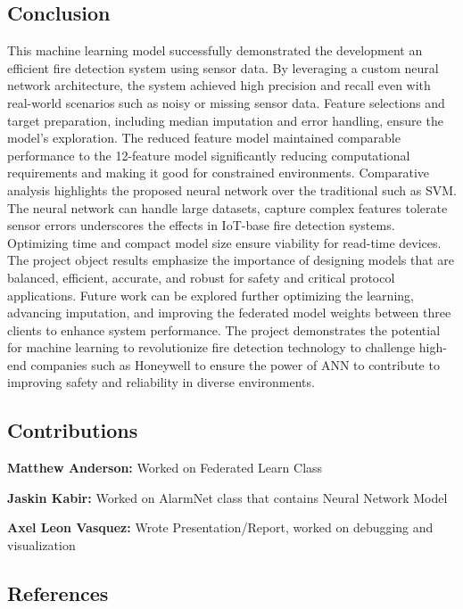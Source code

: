\documentclass[conference]{IEEEtran}
\begin{document}
\subsection{Conclusion}
This machine learning model successfully demonstrated the
development an efficient fire detection system using sensor
data. By leveraging a custom neural network architecture,
the system achieved high precision and recall even with
real-world scenarios such as noisy or missing sensor data.
Feature selections and target preparation, including median
imputation and error handling, ensure the model's
exploration. The reduced feature model maintained comparable
performance to the 12-feature model significantly reducing
computational requirements and making it good for
constrained environments. Comparative analysis highlights
the proposed neural network over the traditional such as
SVM. The neural network can handle large datasets, capture
complex features tolerate sensor errors underscores the
effects in IoT-base fire detection systems. Optimizing time
and compact model size ensure viability for read-time
devices. The project object results emphasize the importance
of designing models that are balanced, efficient, accurate,
and robust for safety and critical protocol applications.
Future work can be explored further optimizing the learning,
advancing imputation, and improving the federated model
weights between three clients to enhance system performance.
The project demonstrates the potential for machine learning
to revolutionize fire detection technology to challenge
high-end companies such as Honeywell to ensure the power of
ANN to contribute to improving safety and reliability in
diverse environments.






\subsection{Contributions}
\textbf{Matthew Anderson:} Worked on Federated Learn Class

\textbf{Jaskin Kabir:} Worked on AlarmNet class that
contains Neural Network Model

\textbf{Axel Leon Vasquez:} Wrote Presentation/Report,
worked on debugging and visualization

\subsection{References}


\end{document}
